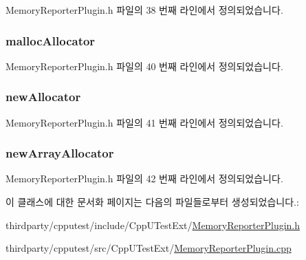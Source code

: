 Memory\+Reporter\+Plugin.\+h 파일의 38 번째 라인에서 정의되었습니다.

\subsubsection[{\texorpdfstring{malloc\+Allocator}{mallocAllocator}}]{ malloc\+Allocator\hspace{0.3cm}{\ttfamily [private]}}\hypertarget{class_memory_reporter_plugin_aa49eebf4ef7d746fe9b0bd9d4f531a26}{}\label{class_memory_reporter_plugin_aa49eebf4ef7d746fe9b0bd9d4f531a26}


Memory\+Reporter\+Plugin.\+h 파일의 40 번째 라인에서 정의되었습니다.

\subsubsection[{\texorpdfstring{new\+Allocator}{newAllocator}}]{ new\+Allocator\hspace{0.3cm}{\ttfamily [private]}}\hypertarget{class_memory_reporter_plugin_a16c3ef79a69a69085afcf09a45204886}{}\label{class_memory_reporter_plugin_a16c3ef79a69a69085afcf09a45204886}


Memory\+Reporter\+Plugin.\+h 파일의 41 번째 라인에서 정의되었습니다.

\subsubsection[{\texorpdfstring{new\+Array\+Allocator}{newArrayAllocator}}]{ new\+Array\+Allocator\hspace{0.3cm}{\ttfamily [private]}}\hypertarget{class_memory_reporter_plugin_a3d542a63f3f729d8721651311e8a7eae}{}\label{class_memory_reporter_plugin_a3d542a63f3f729d8721651311e8a7eae}


Memory\+Reporter\+Plugin.\+h 파일의 42 번째 라인에서 정의되었습니다.



이 클래스에 대한 문서화 페이지는 다음의 파일들로부터 생성되었습니다.\+:\begin{DoxyCompactItemize}
\item 
thirdparty/cpputest/include/\+Cpp\+U\+Test\+Ext/\hyperlink{_memory_reporter_plugin_8h}{Memory\+Reporter\+Plugin.\+h}\item 
thirdparty/cpputest/src/\+Cpp\+U\+Test\+Ext/\hyperlink{_memory_reporter_plugin_8cpp}{Memory\+Reporter\+Plugin.\+cpp}\end{DoxyCompactItemize}
